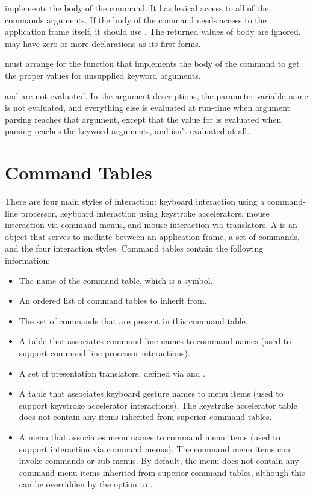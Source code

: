  implements the body of the command.  It has lexical access to all of
the commands arguments.  If the body of the command needs access to the
application frame itself, it should use .  The returned
values of body are ignored.   may have zero or more declarations as
its first forms. 

 must arrange for the function that implements the body of
the command to get the proper values for unsupplied keyword arguments.

 and  are not evaluated.  In the argument
descriptions, the parameter variable name is not evaluated, and everything else
is evaluated at run-time when argument parsing reaches that argument, except
that the value for  is evaluated when parsing reaches the keyword
arguments, and  isn't evaluated at all.


\section {Command Tables}

There are four main styles of interaction: keyboard interaction using a command-
line processor, keyboard interaction using keystroke accelerators, mouse
interaction via command menus, and mouse interaction via translators.  A
 is an object that serves to mediate between an
application frame, a set of commands, and the four interaction styles.  Command
tables contain the following information:

\begin{itemize}
\item The name of the command table, which is a symbol.

\item An ordered list of command tables to inherit from.

\item The set of commands that are present in this command table.

\item A table that associates command-line names to command names (used to
support command-line processor interactions).

\item A set of presentation translators, defined via
 and
.

\item A table that associates keyboard gesture names to menu items (used to
support keystroke accelerator interactions).  The keystroke accelerator table
does not contain any items inherited from superior command tables.

\item A menu that associates menu names to command menu items (used to support
interaction via command menus).  The command menu items can invoke commands or
sub-menus.  By default, the menu does not contain any command menu items
inherited from superior command tables, although this can be overridden by the
 option to .
\end{itemize}

